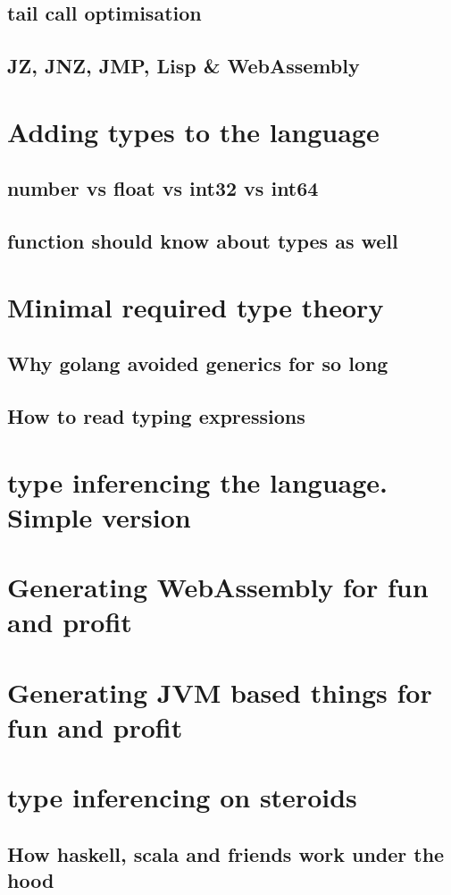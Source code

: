 \documentclass[11pt]{article}
\begin{document}
\subsection{tail call optimisation}
\label{sec:orgf9298dd}
\subsection{JZ, JNZ, JMP, Lisp \& WebAssembly}
\label{sec:org03310f4}
\section{Adding types to the language}
\label{sec:orgf05c8a0}
\subsection{number vs float vs int32 vs int64}
\label{sec:orge4ccba8}
\subsection{function should know about types as well}
\label{sec:org5e6733b}
\section{Minimal required type theory}
\label{sec:orge4322c8}
\subsection{Why golang avoided generics for so long}
\label{sec:orga27fb4b}
\subsection{How to read typing expressions}
\label{sec:orgbfaf9e8}
\section{type inferencing  the language. Simple version}
\label{sec:orgba3284a}
\section{Generating WebAssembly for fun and profit}
\label{sec:orge6de498}
\section{Generating JVM based things for fun and profit}
\label{sec:org870bbf6}
\section{type inferencing on steroids}
\label{sec:org0c2ad84}
\subsection{How haskell, scala and friends work under the hood}
\label{sec:orgd224644}
\end{document}
